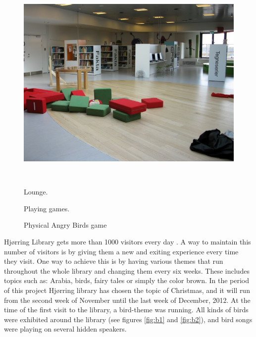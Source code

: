 \begin{figure}[htbp]
\begin{minipage}[b]{0.3\textwidth}
		\includegraphics[width=1.00\textwidth]{Pictures/HjoerringLibrary/p3.jpg} %
	\end{minipage}\\ %
	\begin{minipage}[t]{0.3\textwidth}
		\caption{Lounge.} %
		\label{fig:p1}
	\end{minipage}\hfill
	\begin{minipage}[t]{0.3\textwidth}
		\caption{Playing games.} %
		\label{fig:p2}
	\end{minipage}\hfill	
	\begin{minipage}[t]{0.3\textwidth}
		\caption{Physical Angry Birds game} %
		\label{fig:p3}
	\end{minipage}
\end{figure}

Hj{\o}rring Library gets more than 1000 visitors every day . A way to maintain this number of visitors is by giving them a new and exiting experience every time they visit. One way to achieve this is by having various themes that run throughout the whole library and changing them every six weeks. These includes topics such as: Arabia, birds, fairy tales or simply the color brown. In the period of this project Hj{\o}rring library has chosen the topic of Christmas, and it will run from the second week of November until the last week of December, 2012. At the time of the first visit to the library, a bird-theme was running. All kinds of birds were exhibited around the library (see figures \ref{fig:b1} and \ref{fig:b2}), and bird songs were playing on several hidden speakers.


